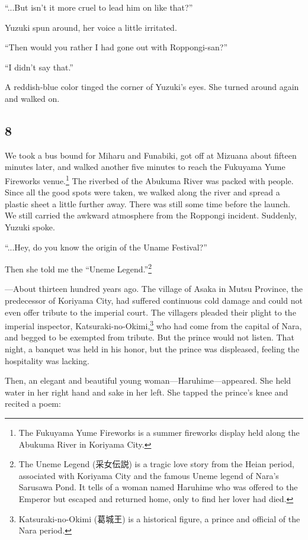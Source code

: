 \documentclass[
    a4paper,
    12pt,
    twoside,
    openany,
    UTF8,
    fontset=windows
]{ctexbook}
\begin{document}
``...But isn't it more cruel to lead him on like that?''

Yuzuki spun around, her voice a little irritated.

``Then would you rather I had gone out with Roppongi-san?''

``I didn't say that.''

A reddish-blue color tinged the corner of Yuzuki's eyes. She turned around again and walked on.


\subsection*{8}

We took a bus bound for Miharu and Funabiki, got off at Mizuana about fifteen minutes later, and walked another five minutes to reach the Fukuyama Yume Fireworks venue.\footnote{The Fukuyama Yume Fireworks is a summer fireworks display held along the Abukuma River in Koriyama City.} The riverbed of the Abukuma River was packed with people. Since all the good spots were taken, we walked along the river and spread a plastic sheet a little further away. There was still some time before the launch. We still carried the awkward atmosphere from the Roppongi incident. Suddenly, Yuzuki spoke.

``...Hey, do you know the origin of the Uname Festival?''

Then she told me the ``Uneme Legend.''\footnote{The Uneme Legend (采女伝説) is a tragic love story from the Heian period, associated with Koriyama City and the famous Uneme legend of Nara's Sarusawa Pond. It tells of a woman named Haruhime who was offered to the Emperor but escaped and returned home, only to find her lover had died.}

---About thirteen hundred years ago. The village of Asaka in Mutsu Province, the predecessor of Koriyama City, had suffered continuous cold damage and could not even offer tribute to the imperial court. The villagers pleaded their plight to the imperial inspector, Katsuraki-no-Okimi,\footnote{Katsuraki-no-Okimi (葛城王) is a historical figure, a prince and official of the Nara period.} who had come from the capital of Nara, and begged to be exempted from tribute. But the prince would not listen. That night, a banquet was held in his honor, but the prince was displeased, feeling the hospitality was lacking.

Then, an elegant and beautiful young woman---Haruhime---appeared. She held water in her right hand and sake in her left. She tapped the prince's knee and recited a poem:
\end{document}
